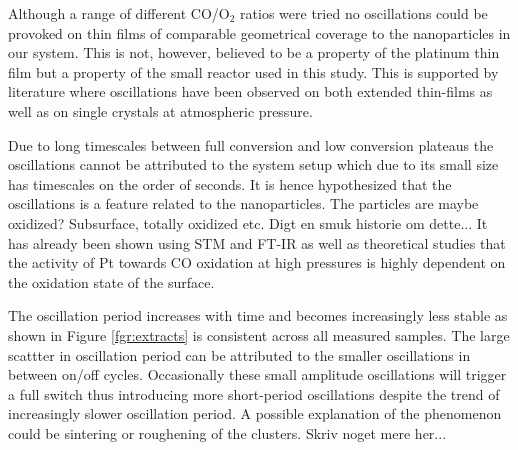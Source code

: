 \documentclass[8.5pt,twoside,twocolumn]{article}
\begin{document}
Although a range of different CO/O$_2$ ratios were tried no oscillations could be provoked on thin films of comparable geometrical coverage to the nanoparticles in our system. This is not, however, believed to be a property of the platinum thin film but a property of the small reactor used in this study. This is supported by literature where oscillations have been observed on both extended thin-films \cite{Singh2010} as well as on single crystals \cite{Hendriksen2005} at atmospheric pressure.

Due to long timescales between full conversion and low conversion plateaus the oscillations cannot be attributed to the system setup which due to its small size has timescales on the order of seconds. It is hence hypothesized that the oscillations is a feature related to the nanoparticles. The particles are maybe oxidized? Subsurface, totally oxidized etc. Digt en smuk historie om dette... 
It has already been shown using STM \cite{Hendriksen2002} and FT-IR \cite{Carlsson2006} as well as theoretical studies \cite{Gong2004} that the activity of Pt towards CO oxidation at high pressures is highly dependent on the oxidation state of the surface.


The oscillation period increases with time and becomes increasingly less stable as shown in Figure \ref{fgr:extracts} is consistent across all measured samples. The large scattter in oscillation period can be attributed to the smaller oscillations in between on/off cycles. Occasionally these small amplitude oscillations will trigger a full switch thus introducing more short-period oscillations despite the trend of increasingly slower oscillation period. A possible explanation of the phenomenon could be sintering or roughening of the clusters. Skriv noget mere her...



\end{document}
